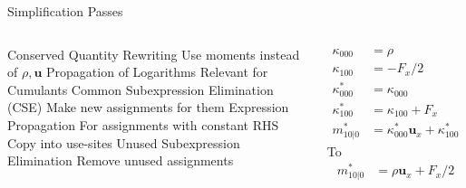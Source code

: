 \begin{frame}{Simplification Passes}
  \begin{columns}
  \begin{outline}
    \1 Conserved Quantity Rewriting
    \2 Use moments instead of $\rho, \bm{u}$
    \1 Propagation of Logarithms
    \2 Relevant for Cumulants
    \1 Common Subexpression Elimination (CSE)
    \2 Make new assignments for them
    \1 Expression Propagation
    \2 For assignments with constant RHS
    \2 Copy into use-sites
    \1 Unused Subexpression Elimination
    \2 Remove unused assignments
  \end{outline}
  \centering
  \begin{center}
  \begin{align*}
    \kappa_{000} &= \rho \\
    \kappa_{100} &= -F_x / 2 \\
    \kappa_{000}^{*} &= \kappa_{000} \\
    \kappa_{100}^{*} &= \kappa_{100} + F_x \\
    m^{*}_{10|0} &= \kappa^{*}_{000} \bm{u}_x + \kappa_{100}^{*}
  \end{align*}
  To
  \begin{align*}
  m^{*}_{10|0} &= \rho \bm{u}_x + F_x / 2 
  \end{align*}
\end{center}
\end{columns}
\end{frame}
